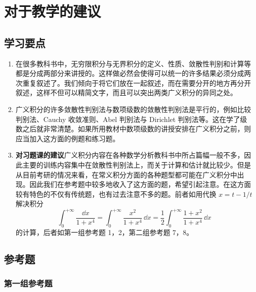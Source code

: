 \section{对于教学的建议}

\subsection{学习要点}

\begin{enumerate}
  \item 在很多教科书中，无穷限积分与无界积分的定义、性质、敛散性判别和计算等都是分成两部分来讲授的。这样做必然会使得可以统一的许多结果必须分成两次重复叙述了。我们倾向于将它们放在一起叙述，而在需要分开的地方再分开叙述，这样不但可以精简文字，而且可以突出两类广义积分的异同之处。

  \item 广义积分的许多敛散性判别法与数项级数的敛散性判别法是平行的，例如比较判别法、Cauchy 收敛准则、Abel 判别法与 Dirichlet 判别法等。这在学了级数之后就非常清楚。如果所用教材中数项级数的讲授安排在广义积分之前，则应当加入这方面的例题和练习题。

  \item \textbf{对习题课的建议}\quad 广义积分内容在各种数学分析教科书中所占篇幅一般不多，因此主要的训练内容集中在敛散性判别法上，而关于计算和估计就比较少。但是从目前考研的情况来看，在常义积分方面的各种题型都可能在广义积分中出现。因此我们在参考题中较多地收入了这方面的题，希望引起注意。在这方面较有特色的不仅有传统题，也有过去注意不多的题。前者如用代换 $x=t-1/t$ 解决积分
  \[
    \int_0^{+\infty}\frac{\dd x}{1+x^4}
    =\int_0^{+\infty}\frac{x^2}{1+x^4}\,\dd x
    =\frac12\int_0^{+\infty}\frac{1+x^2}{1+x^4}\,\dd x
  \]
  的计算，后者如第一组参考题 1，2，第二组参考题 7，8。
\end{enumerate}

\subsection{参考题}

\subsubsection*{第一组参考题}

